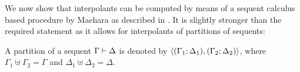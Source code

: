 \begin{comment}
	Suppose $\pi$ contains an instance of \lkrule{w}{r} such that the equality symbolc occurs in the principal formula $A$. 
	Then as it does not occur in the end sequent, it is removed by either an instance of an equality rule or the cut rule. 
	Suppose it is removed via an equality rule. We consider the case of  $\lkrule{=}{l_1}$.
	\begin{prooftree}

		\AxiomCm{\Lambda, A\occurat{t}{p} \proves \Theta}

		\AxiomCm{\varphi}
		\noLine
		\UnaryInfCm{\Gamma \proves \Delta}
		\RightLabelm{\lkrule{w}{r}}
		\UnaryInfCm{\Gamma \proves \Delta, s=t}
		\noLine
		\UnaryInfCm{\vdots}
		\noLine
		\UnaryInfCm{\Sigma \proves \Pi, s=t}

		\RightLabelm{\lkrule{=}{l_1}}                        
		\BinaryInfm{\Lambda, \Sigma, A\occurat{s}{p} \fCenter \Theta, \Pi }
	\end{prooftree}



	not finished


	(proof might become longer, but how does that work? don't innessential cuts remain?)

\end{proof}
\end{comment}


We now show that interpolants can be computed by means of a sequent calculus based procedure by Maehara as described in \cite[Lemma\ 6.5]{takeuti87}.
It is slightly stronger than the required statement as it allows for interpolants of partitions of sequents:

\begin{defi}
	A {partition} of a sequent $\Gamma \vdash \Delta$ is denoted by $ \langle (\Gamma_1; \Delta_1), (\Gamma_2; \Delta_2)\rangle $, where
	$\Gamma_1 \uplus \Gamma_2 = \Gamma$ and 
	$\Delta_1 \uplus \Delta_2 = \Delta$.
\end{defi}




